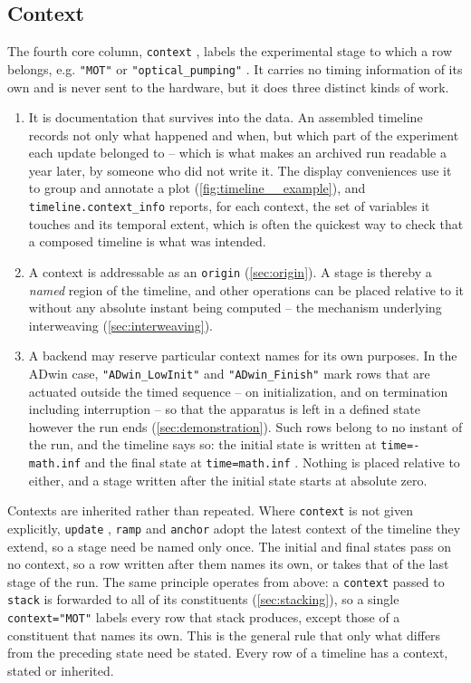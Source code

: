 \documentclass{SciPost}
\newcommand{\python}[1]{%
  \texttt{#1}%
}
\begin{document}
\subsection{Context}
\label{sec:context}
The fourth core column, \python{context}, labels the experimental stage to which a row belongs, e.g. \python{"MOT"} or \python{"optical_pumping"}. It carries no timing information of its own and is never sent to the hardware, but it does three distinct kinds of work.
\begin{enumerate}
\item It is documentation that survives into the data. An assembled timeline records not only what happened and when, but which part of the experiment each update belonged to – which is what makes an archived run readable a year later, by someone who did not write it. The display conveniences use it to group and annotate a plot (\cref{fig:timeline__example}), and \python{timeline.context_info} reports, for each context, the set of variables it touches and its temporal extent, which is often the quickest way to check that a composed timeline is what was intended.

\item A context is addressable as an \python{origin} (\cref{sec:origin}). A stage is thereby a \emph{named} region of the timeline, and other operations can be placed relative to it without any absolute instant being computed – the mechanism underlying interweaving (\cref{sec:interweaving}).

\item A backend may reserve particular context names for its own purposes. In the ADwin case, \python{"ADwin_LowInit"} and \python{"ADwin_Finish"} mark rows that are actuated outside the timed sequence – on initialization, and on termination including interruption – so that the apparatus is left in a defined state however the run ends (\cref{sec:demonstration}). Such rows belong to no instant of the run, and the timeline says so: the initial state is written at \python{time=-math.inf} and the final state at \python{time=math.inf}. Nothing is placed relative to either, and a stage written after the initial state starts at absolute zero.
\end{enumerate}

Contexts are inherited rather than repeated. Where \python{context} is not given explicitly, \python{update}, \python{ramp} and \python{anchor} adopt the latest context of the timeline they extend, so a stage need be named only once. The initial and final states pass on no context, so a row written after them names its own, or takes that of the last stage of the run. The same principle operates from above: a \python{context} passed to \python{stack} is forwarded to all of its constituents (\cref{sec:stacking}), so a single \python{context="MOT"} labels every row that stack produces, except those of a constituent that names its own. This is the general rule that only what differs from the preceding state need be stated. Every row of a timeline has a context, stated or inherited.
 
\end{document}
